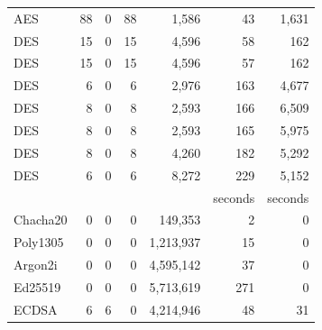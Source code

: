 \begin{table}[h]
\begin{threeparttable}
\begin{tabular}{l@{}r@{~~}rrr@{~~}rr}
        AES\tnote{8}                & 88                     & 0                   & 88                   & 1,586        & 43      & 1,631        \\
        DES\tnote{1}                & 15                     & 0                   & 15                   & 4,596        & 58      & 162          \\
        DES\tnote{2}                & 15                     & 0                   & 15                   & 4,596        & 57      & 162           \\
        DES\tnote{4}                & 6                      & 0                   & 6                    & 2,976         & 163    & 4,677         \\
        DES\tnote{5}                & 8                      & 0                   & 8                    & 2,593         & 166    & 6,509        \\
        DES\tnote{6}                & 8                      & 0                   & 8                    & 2,593        & 165    & 5,975        \\
        DES\tnote{7}                & 8                      & 0                   & 8                    & 4,260         & 182    & 5,292        \\
        DES\tnote{8}                & 6                      & 0                   & 6                    & 8,272         & 229     & 5,152      \\
                           &                        &                     &                      &                  & seconds   & seconds               \\\cline{6-7}
        Chacha20\tnote{3}           & 0                      & 0                   & 0                    & 149,353        & 2     & 0             \\  
        Poly1305\tnote{3}           & 0                      & 0                   & 0                    & 1,213,937      & 15    & 0             \\
        Argon2i\tnote{3}            & 0                      & 0                   & 0                    & 4,595,142       & 37    & 0             \\
        Ed25519\tnote{3}            & 0                      & 0                   & 0                    & 5,713,619       & 271   & 0            \\
        ECDSA\tnote{2}              & 6                      &    6                & 0                    &  4,214,946     &  48   &   31       \\ 

\end{tabular}
\end{threeparttable}
\end{table}
